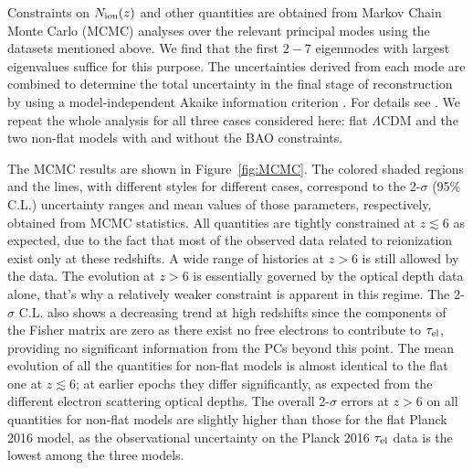 \documentclass[useAMS,usenatbib]{mnras}
\begin{document}
Constraints on $N_{\rm ion}(z)$ and other quantities are obtained from Markov 
Chain Monte Carlo (MCMC) analyses over the relevant principal modes using the 
datasets mentioned above. We find that the first $2-7$ eigenmodes with largest 
eigenvalues suffice for this purpose. The uncertainties derived from each 
mode are combined to determine the total uncertainty in the final stage of 
reconstruction by using a model-independent Akaike information criterion \citep{2007MNRAS.377L..74L}.
For details see \cite{mitra1,mitra2,mitra4}. We repeat 
the whole analysis for all three cases considered here: flat $\Lambda$CDM 
and the two non-flat models with and without the BAO constraints.

The MCMC results are shown in Figure~\ref{fig:MCMC}. The colored shaded 
regions and the lines, with different styles for different cases, 
correspond to the 2-$\sigma$ (95\% C.L.) uncertainty ranges and mean values 
of those parameters, respectively,
obtained from MCMC statistics. All quantities are tightly constrained at 
$z\lesssim6$ as expected, due to the fact that most of the observed data 
related to reionization exist only at these redshifts. A wide range of 
histories at $z >6$ is still allowed by the data. The evolution at $z >6$
is essentially governed by the optical depth data alone, that's why a relatively
weaker constraint is apparent in this regime.  The 2-$\sigma$ C.L. also shows a decreasing trend at high redshifts
since the components of the Fisher matrix are zero as there exist no free electrons to contribute to
$\tau_{\rm el}$, providing no significant information from the PCs beyond this point.
The mean evolution of all the quantities for non-flat models is almost identical to the flat one at
$z\lesssim6$; at earlier epochs they differ significantly, as expected from the different electron scattering
optical depths. The overall 2-$\sigma$ errors at $z>6$ on all quantities for non-flat models are slightly
higher than those for the flat Planck 2016 model, as 
the observational uncertainty on the Planck 2016 $\tau_{\rm el}$ data is the 
lowest among the three models.
\end{document}
